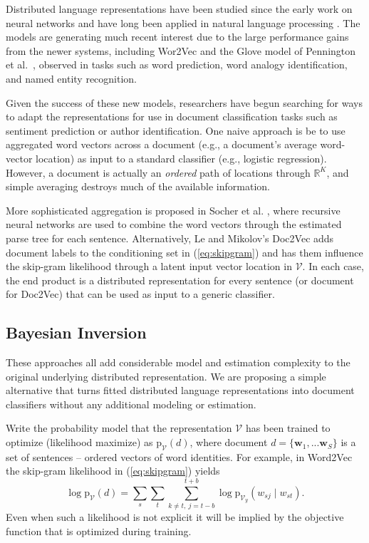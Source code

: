 \documentclass[11pt]{article}
\begin{document}
Distributed language representations have been studied since the early work on
neural networks \cite{rumelhart_learning_1986} and have long been applied in
natural language processing \cite{morin_hierarchical_2005}.  The models are
generating much recent interest due to the large performance gains from the
newer systems, including Wor2Vec and the Glove model of Pennington et
al.~, observed in tasks such as word
prediction, word analogy identification, and named entity recognition.

Given the success of these new models, researchers have begun searching for
ways to adapt the representations for use in document classification tasks
such as sentiment prediction or author identification.  One  naive approach is be
to use aggregated word vectors across a document (e.g., a document's average
word-vector location) as input to a standard classifier (e.g.,
logistic regression).  However, a document is actually  an {\it ordered} path
of  locations through $\mathds{R}^K$, and simple averaging destroys much of the available
information.  

More sophisticated aggregation is proposed in Socher et al.
, where recursive neural
networks are used to combine the word vectors through the estimated parse tree
for each sentence.  Alternatively,  Le and Mikolov's Doc2Vec
 adds document labels to the conditioning set
in (\ref{eq:skipgram}) and has them influence the skip-gram likelihood through
a latent input vector location in $\mathcal{V}$. In each case, the end product
is a distributed representation for every sentence (or document for Doc2Vec)
that can be used as input to a generic classifier.

\subsection{Bayesian Inversion}

These approaches all add considerable model and estimation complexity to the
original underlying distributed representation.  We are proposing a
simple alternative that turns fitted distributed language representations into
document classifiers without any additional modeling or estimation.  

Write the probability model that the representation $\mathcal{V}$ has been
trained to optimize (likelihood maximize) as $\mathrm{p}_{ \mathcal{V}}(d )$,
where document $d = \{\mathbf{w}_1, ... \mathbf{w}_S\}$ is a set of sentences 
-- ordered vectors of word identities.  
For example, in Word2Vec the skip-gram likelihood in
(\ref{eq:skipgram}) yields
\begin{equation}\label{eq:fulllhd}
\log\mathrm{p}_{ \mathcal{V}}(d) = \sum_s \sum_{t} \sum_{k\neq t,~j=t-b}^{t+b} 
\log\mathrm{p}_{ \mathcal{V}_y}(w_{sj}\mid w_{st} ).
\end{equation}
Even when such a likelihood is not explicit it will be implied by the objective function that is optimized during training.
\end{document}
